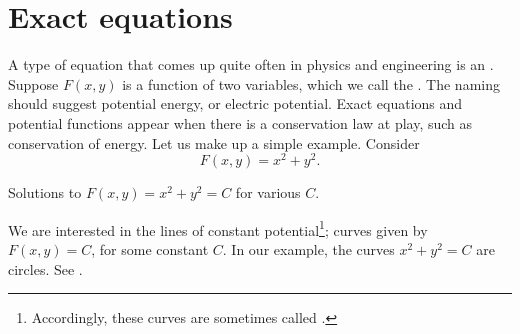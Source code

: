 \sectionnewpage
\section{Exact equations}
\label{exact:section}



A type of equation that comes up quite often in physics and
engineering is an
\emph{}.
Suppose $F(x,y)$ is a function of two variables, which we call the
\emph{}.  The naming should suggest 
potential energy, or electric potential.  Exact equations and potential
functions appear when there is a conservation law at play, such as 
conservation of energy.
Let us make up a simple example.  Consider
\begin{equation*}
F(x,y) = x^2+y^2 .
\end{equation*}

\begin{mywrapfig}[16]{3.25in}
\capstart
{}
\caption{Solutions to $F(x,y) = x^2+y^2 = C$ for various
$C$.\label{exact:circlesfig}}
\end{mywrapfig}
We are interested in the lines of constant potential\footnote{Accordingly,
these curves are sometimes called .};
curves given by $F(x,y) = C$,
for some constant $C$.  In
our example, the curves $x^2+y^2=C$ are circles.  See
.

